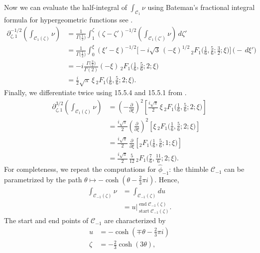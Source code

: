 \documentclass{article}
\newcommand{\fracderiv}[3]{\partial^{#1}_{#2, #3}}
\theoremstyle{definition}
\theoremstyle{plain}
\begin{document}
Now we can evaluate the half-integral of $\int_{\mathcal{C}_1} \nu$ using Bateman's fractional integral formula for hypergeometric functions see \cite[Section 4.1]{koornwinder2015fractional}.
\begin{align*}
\fracderiv{-1/2}{\zeta}{1} \left( \int_{\mathcal{C}_1(\zeta)} \nu \right) & = \frac{1}{\Gamma\big(\tfrac{1}{2}\big)} \int_{1}^\zeta (\zeta - \zeta')^{-1/2} \left( \int_{\mathcal{C}_1(\zeta')} \nu \right)\,d\zeta' \\
& = \frac{1}{\Gamma\big(\tfrac{1}{2}\big)} \int_0^\xi  (\xi' - \xi)^{-1/2} \Big[ -{i}{\sqrt{3}}\, (-\xi)^{1/2}\,{}_2F_1\big(\tfrac{1}{6}, \tfrac{5}{6}; \tfrac{3}{2}; \xi\big) \Big] \,\big( -\,d\xi' \big) \\
& = -i \frac{\Gamma\big(\tfrac{3}{2}\big)}{\Gamma(2)} (-\xi)\,{}_2F_1\big(\tfrac{1}{6}, \tfrac{5}{6}; 2; \xi\big) \\
& = \frac{i}{2} \sqrt{\pi}\,\xi\, {}_2F_1\big(\tfrac{1}{6}, \tfrac{5}{6}; 2; \xi\big).
\end{align*}
Finally, we differentiate twice using 15.5.4 and 15.5.1 from \cite{dlmf}.
\begin{align*}
\fracderiv{3/2}{\zeta}{1} \left( \int_{\mathcal{C}_1(\zeta)} \nu \right) & = \left(-\tfrac{\partial}{\partial \xi}\right)^2 \left[ \frac{i\sqrt{\pi}}{2}\,\xi\, {}_2F_1\big(\tfrac{1}{6}, \tfrac{5}{6}; 2; \xi\big) \right] \\
& =  \tfrac{i\sqrt{\pi}}{2} \left(\tfrac{\partial}{\partial \xi}\right)^2 \left[ \xi\,{}_2F_1\big(\tfrac{1}{6}, \tfrac{5}{6}; 2; \xi\big) \right] \\
& = \tfrac{i\sqrt{\pi}}{2}\,\tfrac{\partial}{\partial \xi} \left[ {}_2F_1\big(\tfrac{1}{6}, \tfrac{5}{6}; 1; \xi\big) \right] \\
& = \tfrac{i\sqrt{\pi}}{2}\,\tfrac{5}{12}\, {}_2F_1\big(\tfrac{7}{6}, \tfrac{11}{6}; 2; \xi\big).
\end{align*}
%
For completeness, we repeat the computations for $\hat{\phi}_{-1}$: the thimble $\mathcal{C}_{-1}$ can be parametrized by the path $\theta \mapsto -\cosh(\theta - \tfrac{2}{3}\pi i)$. Hence,
\begin{align*}
\int_{\mathcal{C}_{-1}(\zeta)} \nu & = \int_{\mathcal{C}_{-1}(\zeta)} du \\
& = u \Big|_{\operatorname{start} \mathcal{C}_{-1}(\zeta)}^{\operatorname{end}\mathcal{C}_{-1}(\zeta)}.
\end{align*}
The start and end points of $\mathcal{C}_{-1}$ are characterized by
\begin{align*}
u & = -\cosh(\mp\theta - \tfrac{2}{3}\pi i) \\
\zeta & = -\tfrac{2}{3} \cosh(3\theta),
\end{align*}
\end{document}
